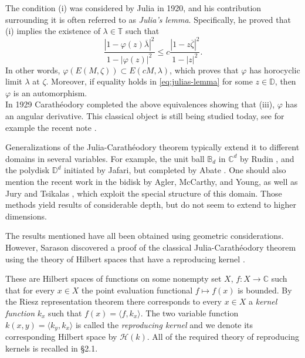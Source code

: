 \documentclass[leqno, final]{article}
\theoremstyle{definition}
\newcommand{\ball}{\mathbb{B}}
\newcommand{\disk}{\mathbb{D}}
\newcommand{\plane}{\mathbb{C}}
\newcommand{\torus}{\mathbb{T}}
\newcommand{\Hilbert}{\mathcal{H}}
\renewcommand{\phi}{\varphi}
\renewcommand{\bar}{\overline}
\newcommand{\la}{\langle}
\newcommand{\ra}{\rangle}
\begin{document}
The condition (i) was considered by Julia \cite{julia} in 1920, and his contribution
surrounding it is often referred to as \emph{Julia's lemma}. Specifically, he proved that (i)
implies the existence of $\lambda\in\torus$ such that
\begin{equation}\label{eq:julias-lemma}
	\frac{|1-\phi(z)\bar\lambda|^2}{1-|\phi(z)|^2}
	\leq c\frac{|1-z\bar\zeta|^2}{1-|z|^2}.
\end{equation}
In other words, $\phi(E(M,\zeta))\subset E(cM,\lambda)$, which proves that $\phi$ has
horocyclic limit $\lambda$ at $\zeta$. Moreover, if equality holds in
\eqref{eq:julias-lemma} for some $z\in\disk$, then $\phi$ is an automorphism.
\\ In 1929 Carathéodory \cite{caratheodory} completed the above equivalences
showing that (iii), $\phi$ has an angular derivative. This classical
object is still being studied today, see for example the recent note
\cite{bergman_angular}.

Generalizations of the Julia-Carathéodory theorem typically extend it to different
domains in several variables. For example, the unit ball $\ball_d$ in $\plane^d$
by Rudin \cite{rudin_unit-ball}, and the polydisk $\disk^d$ initiated by Jafari,
but completed by Abate \cite{jafari_polydisk, abate_polydisk}.
One should also mention the recent work in the bidisk by Agler, McCarthy, and Young, as
well as Jury and Tsikalas
\cite{agler-mccarthy_bidisk, jury-tsikalas_denjoy-wolff}, which exploit the special structure
of this domain. Those methods yield results of considerable depth, but do not seem to
extend to higher dimensions.

The results mentioned have all been obtained using geometric considerations.
However, Sarason discovered a proof of the classical Julia-Carathéodory
theorem using the theory of Hilbert spaces that have a reproducing kernel
\cite{sarason_julia-caratheodory, sarason}.

These are Hilbert spaces of
functions on some nonempty set $X$, $f:X\to\plane$ such that for every $x\in
X$ the point evaluation functional $f\mapsto f(x)$ is bounded. By the Riesz
representation theorem there corresponds to every $x\in X$ a \emph{kernel function} $k_x$ such
that $f(x) = \la f,k_x\ra$. The two variable function
$k(x,y) = \la k_y, k_x \ra $ is called the \emph{reproducing kernel} and we denote
its corresponding Hilbert space by $\Hilbert(k)$.
All of the required theory of reproducing kernels is recalled in \S2.1.
\end{document}
